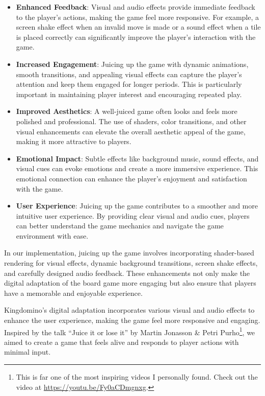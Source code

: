 \documentclass[conference]{IEEEtran}
\begin{document}
\begin{itemize}
    \item \textbf{Enhanced Feedback}: Visual and audio effects provide immediate feedback to the player's actions, making the game feel more responsive. For example, a screen shake effect when an invalid move is made or a sound effect when a tile is placed correctly can significantly improve the player's interaction with the game.
    \item \textbf{Increased Engagement}: Juicing up the game with dynamic animations, smooth transitions, and appealing visual effects can capture the player's attention and keep them engaged for longer periods. This is particularly important in maintaining player interest and encouraging repeated play.
    \item \textbf{Improved Aesthetics}: A well-juiced game often looks and feels more polished and professional. The use of shaders, color transitions, and other visual enhancements can elevate the overall aesthetic appeal of the game, making it more attractive to players.
    \item \textbf{Emotional Impact}: Subtle effects like background music, sound effects, and visual cues can evoke emotions and create a more immersive experience. This emotional connection can enhance the player's enjoyment and satisfaction with the game.
    \item \textbf{User Experience}: Juicing up the game contributes to a smoother and more intuitive user experience. By providing clear visual and audio cues, players can better understand the game mechanics and navigate the game environment with ease.
\end{itemize}

In our implementation, juicing up the game involves incorporating shader-based rendering for visual effects, dynamic background transitions, screen shake effects, and carefully designed audio feedback. These enhancements not only make the digital adaptation of the board game more engaging but also ensure that players have a memorable and enjoyable experience.

Kingdomino's digital adaptation incorporates various visual and audio effects to enhance the user experience, making the game feel more responsive and engaging. Inspired by the talk ``Juice it or lose it'' by Martin Jonasson \& Petri Purho\footnote{This is far one of the most inspiring videos I personally found. Check out the video at \url{https://youtu.be/Fy0aCDmgnxg}.}, we aimed to create a game that feels alive and responds to player actions with minimal input.
\end{document}
